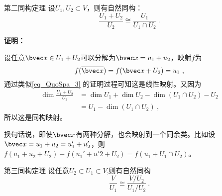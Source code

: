 \begin{theorem}{第二同构定理}
设$U_1,U_2\subset V$，则有自然同构：
\begin{equation}
\frac{U_1+U_2}{U_2}\cong \frac{U_1}{U_1\cap U_2}~.
\end{equation}
\end{theorem}
\textbf{证明：}

设任意$\bvec x\in U_1+U_2$可以分解为$\bvec x=u_1+u_2$，映射$f$为
\begin{equation}
f(\overline {\bvec x})=f(\bvec x+U_2)=u_1~,
\end{equation}
通过类似\autoref{eq_QuoSpa_3} 的证明过程可知这是线性映射。又因为
\begin{equation}
\begin{aligned}
\dim\frac{U_1+U_2}{U_2}&=\dim U_1+\dim U_2-\dim (U_1\cap U_2)-U_2\\
&=U_1-\dim(U_1\cap U_2)~,
\end{aligned}
\end{equation}
所以这是同构映射。

换句话说，即使$\bvec x$有两种分解，也会映射到一个同余类。比如设$\bvec x=u_1+u_2=u'_1+u'_2$，则$f(u_1+u_2+U_2)-f(u_1'+u'2+U_2)=f(u_1+U_1\cap U_2)$。

\begin{theorem}{第三同构定理}
设任意$U_2\subset U_1\subset V$,则有自然同构
\begin{equation}
\frac{V}{U_1}\cong \frac{V/U_2}{U_1/U_2}~.
\end{equation}

\end{theorem}
\begin{corollary}{}

\end{corollary}






